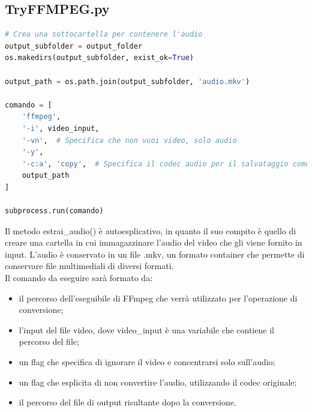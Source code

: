 \documentclass{report}
\begin{document}
\subsection{TryFFMPEG.py}
\begin{lstlisting}[language=Python, breaklines=true]
# Crea una sottocartella per contenere l'audio
output_subfolder = output_folder
os.makedirs(output_subfolder, exist_ok=True)

output_path = os.path.join(output_subfolder, 'audio.mkv')

comando = [
    'ffmpeg',
    '-i', video_input,
    '-vn',  # Specifica che non vuoi video, solo audio
    '-y',
    '-c:a', 'copy',  # Specifica il codec audio per il salvataggio come MP3
    output_path
]

subprocess.run(comando)
\end{lstlisting}
Il metodo estrai\_audio() è autoesplicativo, in quanto il suo compito è quello di creare una cartella in cui immagazzinare l’audio del video che gli viene fornito in input. L’audio è conservato in un file .mkv, un formato container che permette di conservare file multimediali di diversi formati. \\
Il comando da eseguire sarà formato da:
\begin{itemize}
        \item
        il percorso dell'eseguibile di FFmpeg che verrà utilizzato per l'operazione di conversione;
        \item
        l’input del file video, dove video\_input è una variabile che contiene il percorso del file;
  \item
        un flag che specifica di ignorare il video e concentrarsi solo sull'audio;
  \item
        un flag che esplicita di non convertire l’audio, utilizzando il codec originale;
  \item
        il percorso del file di output risultante dopo la conversione.
\end{itemize}
\end{document}
